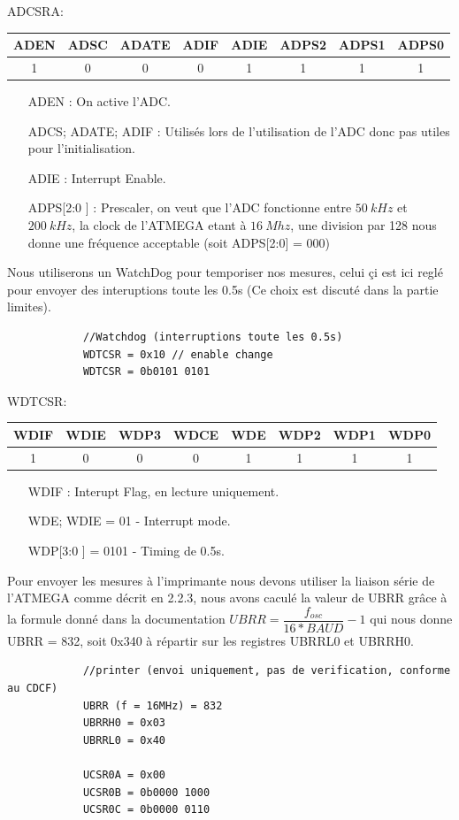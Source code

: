 \documentclass[a4paper, 12pt]{article}
\begin{document}
		ADCSRA:
		\begin{center}
			\begin{tabular}{|c|c|c|c|c|c|c|c|}
				\hline
				ADEN & ADSC & ADATE & ADIF & ADIE & ADPS2 & ADPS1 & ADPS0\\
				\hline
				1 & 0 & 0 & 0 & 1 & 1 & 1 & 1\\
				\hline
			\end{tabular}
		\end{center}
		\begin{itemize}
			\item[ADEN] : On active l'ADC.
			\item[ADCS; ADATE; ADIF] : Utilisés lors de l'utilisation de l'ADC donc pas utiles pour l'initialisation.
			\item[ADIE] : Interrupt Enable.
			\item[ADPS[2:0]] : Prescaler, on veut que l'ADC fonctionne entre $50\ kHz$ et $200\ kHz$, la clock de l'ATMEGA etant à $16\ Mhz$, une division par 128 nous donne une fréquence acceptable (soit ADPS[2:0] = 000)
		\end{itemize}
		
		Nous utiliserons un WatchDog pour temporiser nos mesures, celui çi est ici reglé pour envoyer des interuptions toute les 0.5s (Ce choix est discuté dans la partie limites).
		\begin{lstlisting}
			//Watchdog (interruptions toute les 0.5s)
			WDTCSR = 0x10 // enable change
			WDTCSR = 0b0101 0101
		\end{lstlisting}
		WDTCSR:
		\begin{center}
			\begin{tabular}{|c|c|c|c|c|c|c|c|}
				\hline
				WDIF & WDIE & WDP3 & WDCE & WDE & WDP2 & WDP1 & WDP0\\
				\hline
				1 & 0 & 0 & 0 & 1 & 1 & 1 & 1\\
				\hline
			\end{tabular}
		\end{center}
		\begin{itemize}
			\item[WDIF] : Interupt Flag, en lecture uniquement.
			\item[WDE; WDIE] = 01 - Interrupt mode.
			\item[WDP[3:0]] = 0101 - Timing de 0.5s.
		\end{itemize}

		Pour envoyer les mesures à l'imprimante nous devons utiliser la liaison série de l'ATMEGA comme décrit en 2.2.3, nous avons caculé la valeur de UBRR grâce à la formule donné dans la documentation $UBRR = \dfrac{f_{osc}}{16*BAUD} - 1$ qui nous donne UBRR = 832, soit 0x340 à répartir sur les registres UBRRL0 et UBRRH0.
		\begin{lstlisting}
			//printer (envoi uniquement, pas de verification, conforme au CDCF)
			UBRR (f = 16MHz) = 832
			UBRRH0 = 0x03
			UBRRL0 = 0x40
			
			UCSR0A = 0x00
			UCSR0B = 0b0000 1000
			UCSR0C = 0b0000 0110			
		\end{lstlisting}	
	
\end{document}
